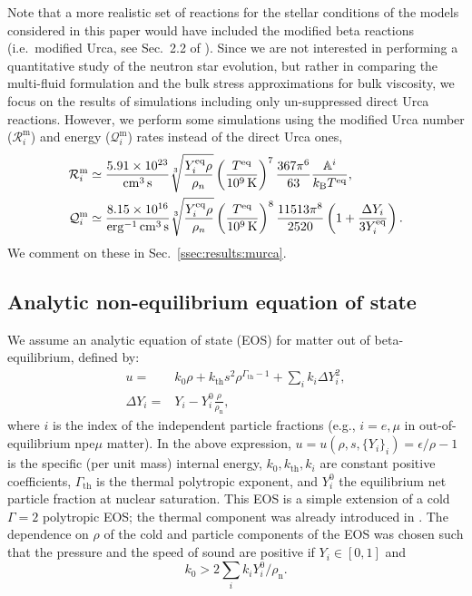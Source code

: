 \documentclass[aps,prd,twocolumn,a4paper,floatfix,nofootbib,superscriptaddress,nofootinbib]{revtex4}
\newcommand{\rth}{\mathrm{th}}
\newcommand{\rn}{\mathrm{n}}
\newcommand{\req}{\mathrm{eq}}
\begin{document}
Note that a more realistic set of reactions for the stellar conditions of the
models considered in this paper would have included the modified beta reactions
(i.e.~modified Urca, see Sec.~2.2 of \citet{Haensel92}).  Since we are not
interested in performing a quantitative study of the neutron star evolution,
but rather in comparing the multi-fluid formulation and the bulk stress
approximations for bulk viscosity, we focus on the results of simulations
including only un-suppressed direct Urca reactions.  However, we perform
some simulations using the modified Urca number ($\mathcal R_i^\mathrm{m}$) and
energy ($\mathcal Q_i^\mathrm{m}$) rates \cite{Camelio22a} instead of
the direct Urca ones,
%
\begin{align}
%
\label{eq:R-murca}
%
\mathcal R_i^\mathrm{m}\simeq{}& \frac{5.91\times 10^{23}}{\unit{cm^{3}\,s}}
\sqrt[3]{\frac{Y^\req_i\rho}{\rho_n}}\left(\frac{T^\req}{\unit[10^9]{K}}\right)^7
\frac{367\pi^6}{63} \frac{\mathbb A^i}{k_\mathrm{B}T^\req},\\
%
\label{eq:Q-murca}
%
\mathcal Q_i^\mathrm{m}\simeq{}& \frac{8.15\times10^{16}}{\unit{erg^{-1}\,cm^{3}\,s}}
\sqrt[3]{\frac{Y^\req_i\rho}{\rho_n}} \left(\frac{T^\req}{\unit[10^9]{K}}\right)^8
\frac{11513\pi^8}{2520} \left(1 + \frac{\Delta Y_i}{3Y^\req_i}\right).
%
\end{align}
%
We comment on these in Sec.~\ref{ssec:results:murca}.

\subsection{Analytic non-equilibrium equation of state}

We assume an analytic equation of state (EOS) for matter out of beta-equilibrium, defined by:
%
\begin{align}
\label{eq:eos}
%
u={}& k_0\rho + k_\rth s^2\rho^{\Gamma_\rth-1}
+ \sum_i k_i\Delta Y_i^2,\\
\Delta Y_i={}&{}Y_i - Y_i^0 \frac{\rho}{\rho_\rn},
\end{align}
%
where $i$ is the index of the independent particle fractions (e.g., $i=e,\mu$ in out-of-equilibrium npe$\mu$ matter). 
In the above expression, $u=u(\rho,s,\{Y_i\}_i)=\epsilon/\rho-1$ is the specific (per unit mass)
internal energy, $k_0,k_\rth,k_i$ are constant positive coefficients,
$\Gamma_\rth$ is the thermal polytropic exponent,
and $Y_i^0$ the equilibrium net particle fraction at nuclear saturation.
This EOS is a simple extension of a cold $\Gamma=2$ polytropic EOS; the
thermal component was already introduced in \citet{Camelio19}.
The dependence on $\rho$ of the cold and particle components of the EOS
was chosen \citep{Camelio22a} such that the pressure and the speed of sound are positive if
$Y_i\in[0,1]$ and
%
\begin{equation}
\label{eq:positivity-condition}
k_0>2{\sum_ik_i Y_i^0}/{\rho_\rn}.
\end{equation}
\end{document}
